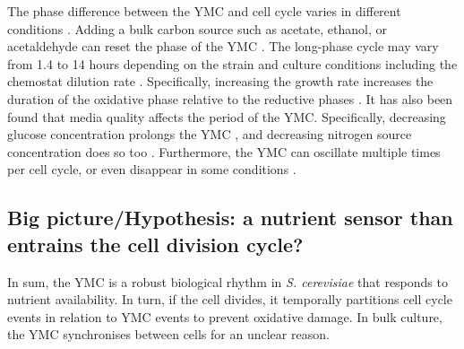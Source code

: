 The phase difference between the YMC and cell cycle varies in different conditions %
\citep{ewaldYeastCyclinDependentKinase2016}. %
Adding a bulk carbon source such as acetate, ethanol, or acetaldehyde can reset the phase of the YMC \citep{kuangMsn2RegulateExpression2017, krishnaMinimalPushPull2018}.
The long-phase cycle may vary from 1.4 to 14 hours depending on the strain and culture conditions including the chemostat dilution rate \citep{caustonMetabolicRhythmsFramework2018}. %
Specifically, increasing the growth rate increases the duration of the oxidative phase relative to the reductive phases \citep{slavovCouplingGrowthRate2011}.
It has also been found that media quality affects the period of the YMC.
Specifically, decreasing glucose concentration prolongs the YMC \citep{mellorMolecularBasisMetabolic2016,papagiannakisAutonomousMetabolicOscillations2017},
and decreasing nitrogen source concentration does so too \citep{baumgartnerFlavinbasedMetabolicCycles2018}.
Furthermore, the YMC can oscillate multiple times per cell cycle, or even disappear in some conditions \citep{baumgartnerFlavinbasedMetabolicCycles2018}. %

\subsection{Big picture/Hypothesis: a nutrient sensor than entrains the cell division cycle?}
\label{subsec:intro-ymc-hypothesis}
In sum, the YMC is a robust biological rhythm in \emph{S. cerevisiae} that responds to nutrient availability.
In turn, if the cell divides, it temporally partitions cell cycle events in relation to YMC events to prevent oxidative damage.
In bulk culture, the YMC synchronises between cells for an unclear reason.

